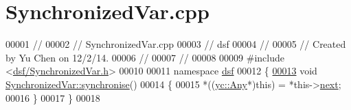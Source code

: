 \hypertarget{_synchronized_var_8cpp_source}{}\section{Synchronized\+Var.\+cpp}
\label{_synchronized_var_8cpp_source}

\begin{DoxyCode}
00001 \textcolor{comment}{//}
00002 \textcolor{comment}{//  SynchronizedVar.cpp}
00003 \textcolor{comment}{//  dsf}
00004 \textcolor{comment}{//}
00005 \textcolor{comment}{//  Created by Yu Chen on 12/2/14.}
00006 \textcolor{comment}{//}
00007 \textcolor{comment}{//}
00008 
00009 \textcolor{preprocessor}{#include <\hyperlink{_synchronized_var_8h}{dsf/SynchronizedVar.h}>}
00010 
00011 \textcolor{keyword}{namespace }\hyperlink{namespacedsf}{dsf}
00012 \{
\hypertarget{_synchronized_var_8cpp_source_l00013}{}\hyperlink{classdsf_1_1_synchronized_var_ac8465a885c4dbb5bc5ca9ad25f42c3ec}{00013}     \textcolor{keywordtype}{void} \hyperlink{classdsf_1_1_synchronized_var_ac8465a885c4dbb5bc5ca9ad25f42c3ec}{SynchronizedVar::synchronise}()
00014     \{
00015         *((\hyperlink{classyc_1_1_any}{yc::Any}*)\textcolor{keyword}{this}) = *this->\hyperlink{classdsf_1_1_synchronisable_ae2434faac15d3184da1543a91e175713}{next};
00016     \}
00017 \}
00018 
\end{DoxyCode}
